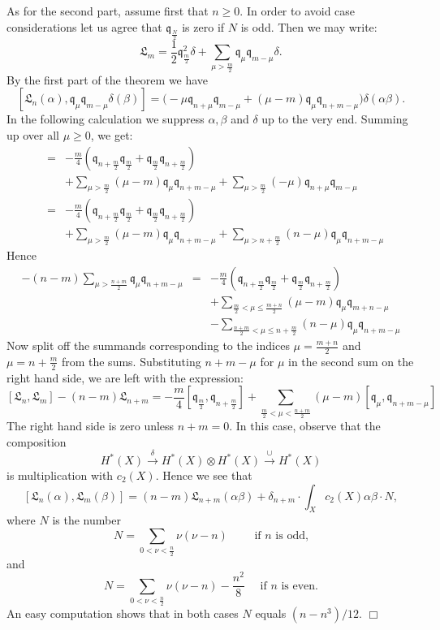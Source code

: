 \documentclass[twoside,11pt]{article}
\newcommand{\qed}{\hspace*{\fill}$\Box$\vspace{2ex}}
\newcommand{\gothq}{{\mathfrak q}}
\newcommand{\gothL}{{\mathfrak L}}
\newcommand{\tensor}{\otimes}
\newcommand{\qq}{\gothq}
\newcommand{\LL}{\gothL}
\newcommand{\lra}{\longrightarrow}
\begin{document}
As for the second part, assume first that $n\geq0$. In order to avoid
case considerations let us agree that $\qq_{\frac{N}{2}}$ is zero if $N$ is odd. Then
we may write:
$$\LL_m=\frac{1}{2}\qq_{\frac{m}{2}}^2\delta+\sum_{\mu>\frac{m}{2}}\qq_\mu\qq_{m-\mu}\delta.$$
By the first part of the theorem we have
$$[\LL_n(\alpha),\qq_\mu\qq_{m-\mu}\delta(\beta)]
=\Big(-\mu\qq_{n+\mu}\qq_{m-\mu}+(\mu-m)\qq_\mu\qq_{n+m-\mu}\Big)
\delta(\alpha\beta).$$
In the following calculation we suppress $\alpha,\beta$ and $\delta$ up to the very
end. Summing up over all $\mu\geq 0$, we get:
\begin{eqnarray*}
[\LL_n,\LL_m]&=&-\frac{m}{4}(\qq_{n+\frac{m}{2}}\qq_{\frac{m}{2}}+\qq_{\frac{m}{2}}\qq_{n+\frac{m}{2}})\\
&&+\sum_{\mu>\frac{m}{2}}(\mu-m)\qq_{\mu}\qq_{n+m-\mu}
+\sum_{\mu>\frac{m}{2}}(-\mu)\qq_{n+\mu}\qq_{m-\mu}\\
&=&-\frac{m}{4}(\qq_{n+\frac{m}{2}}\qq_{\frac{m}{2}}+\qq_{\frac{m}{2}}\qq_{n+\frac{m}{2}})\\
&&+\sum_{\mu>\frac{m}{2}}(\mu-m)\qq_{\mu}\qq_{n+m-\mu}
+\sum_{\mu>n+\frac{m}{2}}(n-\mu)\qq_{\mu}\qq_{n+m-\mu}
\end{eqnarray*}
Hence
\begin{eqnarray*}
[\LL_n,\LL_m]-(n-m)\sum_{\mu>\frac{n+m}{2}}\qq_\mu\qq_{n+m-\mu}&=&
-\frac{m}{4}(\qq_{n+\frac{m}{2}}\qq_{\frac{m}{2}}+\qq_{\frac{m}{2}}\qq_{n+\frac{m}{2}})\\
&&+\sum_{\frac{m}{2}<\mu\leq\frac{m+n}{2}}(\mu-m)\qq_\mu\qq_{m+n-\mu}\\
&&-\sum_{\frac{n+m}{2}<\mu\leq n+\frac{m}{2}}(n-\mu)\qq_\mu\qq_{n+m-\mu}
\end{eqnarray*}
Now split off the summands corresponding to the indices $\mu=\frac{m+n}{2}$
and $\mu=n+\frac{m}{2}$ from the sums. Substituting $n+m-\mu$
for $\mu$ in the second sum on the right hand side, we are left with the
expression:
$$[\LL_n,\LL_m]-(n-m)\LL_{n+m}=
-\frac{m}{4}[\qq_{\frac{m}{2}},\qq_{n+\frac{m}{2}}]+\sum_{\frac{m}{2}<\mu<\frac{n+m}{2}}(\mu-m)[\qq_\mu,\qq_{n+m-\mu}]
$$
The right hand side is zero unless $n+m=0$. In this case, observe that the
composition
$$H^*(X)\stackrel{\delta}{\lra}H^*(X)\tensor H^*(X) \stackrel{\cup}\lra H^*(X)$$
is multiplication with $c_2(X)$. Hence we see that
$$[\LL_n(\alpha),\LL_m(\beta)]=(n-m)\LL_{n+m}(\alpha\beta)+\delta_{n+m}\cdot\int_Xc_2(X)\alpha\beta\cdot N,$$
where $N$ is the number
$$N=\sum_{0<\nu<\frac{n}{2}}\nu(\nu-n)\qquad\mbox{ if }n\mbox{ is odd,}$$
and 
$$N=\sum_{0<\nu<\frac{n}{2}}\nu(\nu-n)-\frac{n^2}{8}\quad\mbox{ if }n\mbox{ is even.}
$$
An easy computation shows that in both cases $N$ equals $(n-n^3)/12$.
\qed
\end{document}
